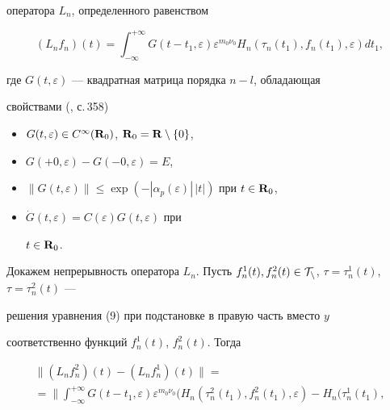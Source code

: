 \begin{pf}
оператора $L_n$, определенного равенством 


$$ 


(L_n f_n)(t)=\int^{+\infty}_{-\infty} 


G(t-t_1,\varepsilon)\varepsilon^{m_0\nu_0} 


H_n(\tau_n(t_1),f_n(t_1),\varepsilon)d t_1, 


$$ 


где $G(t,\varepsilon)$ --- квадратная матрица порядка $n-l$, обладающая 


свойствами (\cite{3}, с.\,358) 


\begin{itemize} 


\item[1)] $G(t,\varepsilon)\in C^\infty(\bold R_0)$, $\bold 


R_0=\bold R\setminus\{0\}$, 


\item[2)] $G(+0,\varepsilon)-G(-0,\varepsilon)=E$, 


\item[3)] $\|G(t,\varepsilon)\|\le 


\exp(-|\alpha_p(\varepsilon)|\,|t|)$ при $t\in\bold R_0$, 


\item[4)] $\Dot G(t,\varepsilon)=C(\varepsilon)G(t,\varepsilon)$ при 


$t\in\bold R_0$.


\end{itemize} 


 


Докажем непрерывность оператора $L_n$. Пусть $f^1_n(t), 


f^2_n(t)\in\cal T_n$, $\tau=\tau^1_n(t)$, $\tau=\tau^2_n(t)$ --- 


решения уравнения (9) при подстановке в правую часть вместо $y$ 


соответственно функций $f^1_n(t)$, $f^2_n(t)$. Тогда 


\begin{multline} 


\|(L_n f^2_n)(t)-(L_n f^1_n)(t)\|= \\ 


% 


=\bigg\|\int^{+\infty}_{-\infty} G(t-t_1,\varepsilon) 


\varepsilon^{m_0\nu_0}(H_n(\tau^2_n(t_1), 


f^2_n(t_1),\varepsilon)-H_n(\tau^1_n(t_1), 



\end{multline}
\end{pf}
